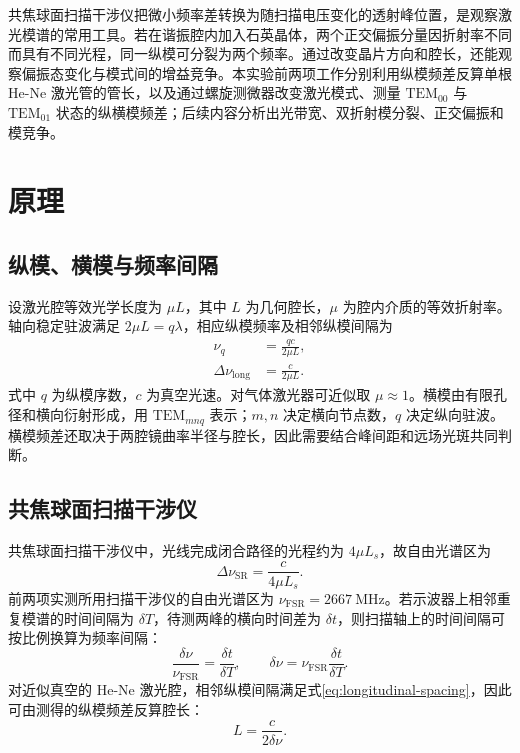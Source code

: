 \documentclass[UTF8,a4paper,10pt]{ctexart}
\begin{document}
共焦球面扫描干涉仪把微小频率差转换为随扫描电压变化的透射峰位置，是观察激光模谱的常用工具。若在谐振腔内加入石英晶体，两个正交偏振分量因折射率不同而具有不同光程，同一纵模可分裂为两个频率。通过改变晶片方向和腔长，还能观察偏振态变化与模式间的增益竞争。本实验前两项工作分别利用纵模频差反算单根 He-Ne 激光管的管长，以及通过螺旋测微器改变激光模式、测量 $\mathrm{TEM}_{00}$ 与 $\mathrm{TEM}_{01}$ 状态的纵横模频差；后续内容分析出光带宽、双折射模分裂、正交偏振和模竞争\cite{guide}。

\section{原理}

\subsection{纵模、横模与频率间隔}

设激光腔等效光学长度为 $\mu L$，其中 $L$ 为几何腔长，$\mu$ 为腔内介质的等效折射率。轴向稳定驻波满足 $2\mu L=q\lambda$，相应纵模频率及相邻纵模间隔为
\begin{align}
  \nu_q &= \frac{qc}{2\mu L}, \label{eq:longitudinal-frequency}\\
  \Delta\nu_{\mathrm{long}} &= \frac{c}{2\mu L}. \label{eq:longitudinal-spacing}
\end{align}
式中 $q$ 为纵模序数，$c$ 为真空光速。对气体激光器可近似取 $\mu\approx1$。横模由有限孔径和横向衍射形成，用 $\mathrm{TEM}_{mnq}$ 表示；$m,n$ 决定横向节点数，$q$ 决定纵向驻波。横模频差还取决于两腔镜曲率半径与腔长，因此需要结合峰间距和远场光斑共同判断\cite{zhou}。

\subsection{共焦球面扫描干涉仪}

共焦球面扫描干涉仪中，光线完成闭合路径的光程约为 $4\mu L_s$，故自由光谱区为
\begin{equation}
  \Delta\nu_{\mathrm{SR}}=\frac{c}{4\mu L_s}. \label{eq:fsr}
\end{equation}
前两项实测所用扫描干涉仪的自由光谱区为 $\nu_{\mathrm{FSR}}=\SI{2667}{\mega\hertz}$。若示波器上相邻重复模谱的时间间隔为 $\delta T$，待测两峰的横向时间差为 $\delta t$，则扫描轴上的时间间隔可按比例换算为频率间隔：
\begin{equation}
  \frac{\delta\nu}{\nu_{\mathrm{FSR}}}
  =\frac{\delta t}{\delta T},\qquad
  \delta\nu=\nu_{\mathrm{FSR}}\frac{\delta t}{\delta T}. \label{eq:scale}
\end{equation}
对近似真空的 He-Ne 激光腔，相邻纵模间隔满足式\eqref{eq:longitudinal-spacing}，因此可由测得的纵模频差反算腔长：
\begin{equation}
  L=\frac{c}{2\delta\nu}. \label{eq:tube-length}
\end{equation}
\end{document}
